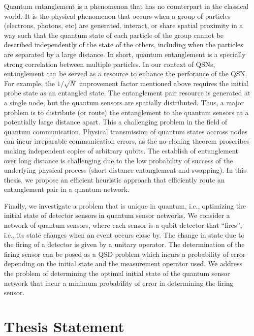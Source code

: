 Quantum entanglement is a phenomenon that has no counterpart in the classical world.
It is the physical phenomenon that occurs when a group of particles (electrons, photons, etc) are generated, interact, or share spatial proximity in a way such that
the quantum state of each particle of the group cannot be described independently of the state of the others, including when the particles
are separated by a large distance.
In short, quantum entanglement is a specially strong correlation between multiple particles.
In our context of QSNs, entanglement can be served as a resource to enhance the perforance of the QSN.
For example, the $1 / \sqrt{N}$ improvement factor mentioned above requires the initial probe state as an entangled state.
The entanglement pair resource is generated at a single node, but the quantum sensors are spatially distributed.
Thus, a major problem is to distribute (or route) the entanglement to the quantum sensors at a potentially large distance apart.
This a challenging problem in the field of quantum communication.
Physical transmission of quantum states accross nodes can incur irreparable communication errors, as the no-cloning theorem proscribes
making independent copies of arbitrary qubits.
The establish of entanglement over long distance is challenging due to the low probability of success of the underlying physical process
(short distance entanglement and swapping).
In this thesis, we propose an efficient heuristic approach that efficiently route an entanglement pair in a quantum network.

Finally, we investigate a problem that is unique in quantum, i.e., optimizing the initial state of detector sensors 
in quantum sensor networks. We consider a network of quantum sensors, where each sensor is a qubit detector that “fires”, 
i.e., its state changes when an event occurs close by. The change in state due to the firing of a detector is given 
by a unitary operator. The determination of the firing sensor can be posed as a QSD problem which incurs a probability 
of error depending on the initial state and the measurement operator used. We address the problem of determining 
the optimal initial state of the quantum sensor network that incur a minimum probability of error in determining the firing sensor.


\section{Thesis Statement}

